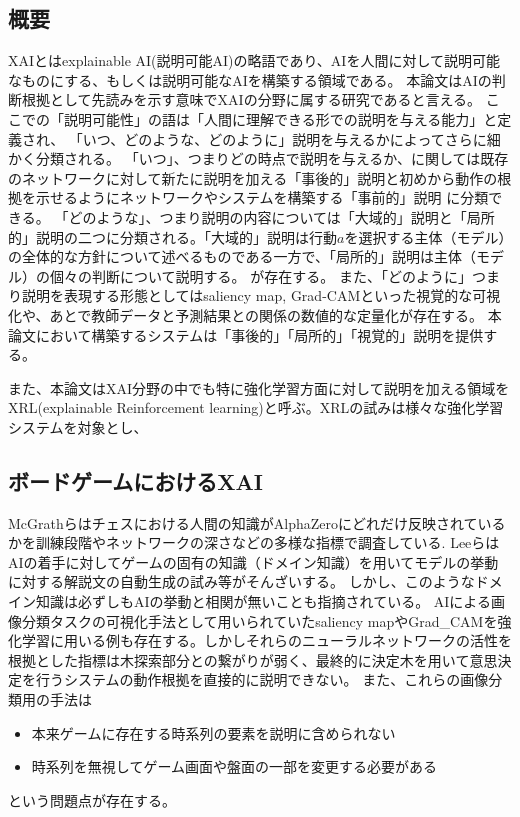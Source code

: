 \subsection{概要}
XAIとはexplainable AI(説明可能AI)の略語であり、AIを人間に対して説明可能なものにする、もしくは説明可能なAIを構築する領域である。
本論文はAIの判断根拠として先読みを示す意味でXAIの分野に属する研究であると言える。
ここでの「説明可能性」の語は「人間に理解できる形での説明を与える能力」\cite{definition}と定義され、
「いつ、どのような、どのように」説明を与えるかによってさらに細かく分類される。
「いつ」、つまりどの時点で説明を与えるか、に関しては既存のネットワークに対して新たに説明を加える「事後的」説明と初めから動作の根拠を示せるようにネットワークやシステムを構築する「事前的」説明
に分類できる\cite{definition}。
「どのような」、つまり説明の内容については「大域的」説明と「局所的」説明の二つに分類される。「大域的」説明は行動$a$を選択する主体（モデル）の全体的な方針について述べるものである一方で、「局所的」説明は主体（モデル）の個々の判断について説明する\cite{gl}。
が存在する。
また、「どのように」つまり説明を表現する形態としてはsaliency map\cite{saliency}, Grad-CAM\cite{Grad-CAM}といった視覚的な可視化や、あとで教師データと予測結果との関係の数値的な定量化\cite{定量}が存在する。
本論文において構築するシステムは「事後的」「局所的」「視覚的」説明を提供する。

また、本論文はXAI分野の中でも特に強化学習方面に対して説明を加える領域をXRL(explainable Reinforcement learning)と呼ぶ。XRLの試みは様々な強化学習システムを対象とし、
\subsection{ボードゲームにおけるXAI}
McGrathら\cite{DeepMind}はチェスにおける人間の知識がAlphaZeroにどれだけ反映されているかを訓練段階やネットワークの深さなどの多様な指標で調査している.
Leeら\cite{DecodeChess}はAIの着手に対してゲームの固有の知識（ドメイン知識）を用いてモデルの挙動に対する解説文の自動生成の試み等がそんざいする。
しかし、このようなドメイン知識は必ずしもAIの挙動と相関が無いことも指摘されている\cite{DeepMind}。
AIによる画像分類タスクの可視化手法として用いられていたsaliency map\cite{saliency}やGrad\_CAM\cite{Grad-CAM}を強化学習に用いる例も存在する\cite{atari-saliency}\cite{gl}\cite{visualize}。しかしそれらのニューラルネットワークの活性を根拠とした指標は木探索部分との繋がりが弱く、最終的に決定木を用いて意思決定を行うシステムの動作根拠を直接的に説明できない。
また、これらの画像分類用の手法は
\begin{itemize}
	\item 本来ゲームに存在する時系列の要素を説明に含められない
	\item 時系列を無視してゲーム画面や盤面の一部を変更する必要がある
\end{itemize}
という問題点が存在する。

